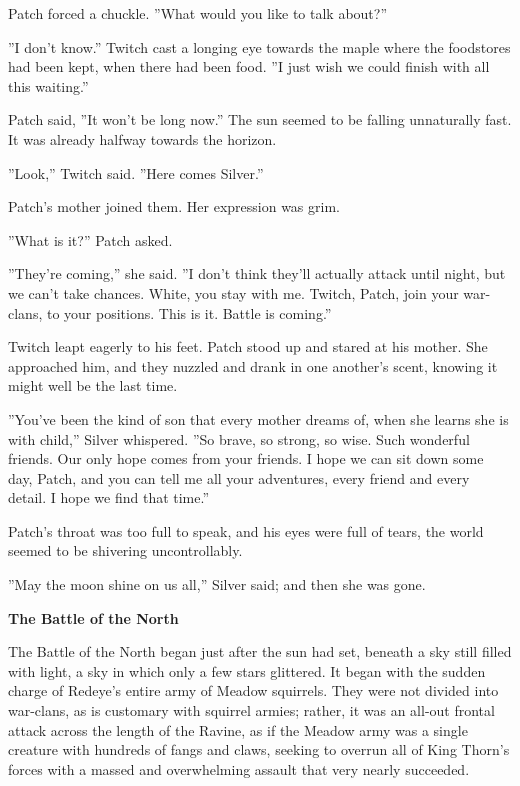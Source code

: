 \documentclass[11pt]{article}
\begin{document}
 Patch forced a chuckle. ''What would you like to talk about?''\par
 ''I don't know.'' Twitch cast a longing eye towards the maple where the foodstores had been kept, when there had been food. ''I just wish we could finish with all this waiting.''\par
 Patch said, ''It won't be long now.'' The sun seemed to be falling unnaturally fast. It was already halfway towards the horizon.\par
 ''Look,'' Twitch said. ''Here comes Silver.''\par
 Patch's mother joined them. Her expression was grim.\par
 ''What is it?'' Patch asked.\par
 ''They're coming,'' she said. ''I don't think they'll actually attack until night, but we can't take chances. White, you stay with me. Twitch, Patch, join your war-clans, to your positions. This is it. Battle is coming.''\par
 Twitch leapt eagerly to his feet. Patch stood up and stared at his mother. She approached him, and they nuzzled and drank in one another's scent, knowing it might well be the last time.\par
 ''You've been the kind of son that every mother dreams of, when she learns she is with child,'' Silver whispered. ''So brave, so strong, so wise. Such wonderful friends. Our only hope comes from your friends. I hope we can sit down some day, Patch, and you can tell me all your adventures, every friend and every detail. I hope we find that time.''\par
 Patch's throat was too full to speak, and his eyes were full of tears, the world seemed to be shivering uncontrollably.\par
 ''May the moon shine on us all,'' Silver said; and then she was gone.\par
\par
{\bf The Battle of the North\par
}\par
 The Battle of the North began just after the sun had set, beneath a sky still filled with light, a sky in which only a few stars glittered. It began with the sudden charge of Redeye's entire army of Meadow squirrels. They were not divided into war-clans, as is customary with squirrel armies; rather, it was an all-out frontal attack across the length of the Ravine, as if the Meadow army was a single creature with hundreds of fangs and claws, seeking to overrun all of King Thorn's forces with a massed and overwhelming assault that very nearly succeeded.\par
\end{document}

